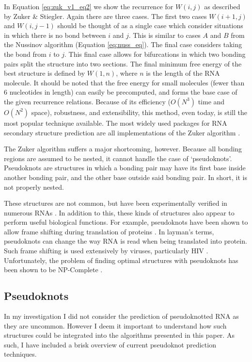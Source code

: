 \documentclass{cshonours}
\begin{document}
In Equation \ref{eq:zuk_v1_eq2} we show the recurrence for $W(i, j)$ as described by Zuker \& Stiegler.
Again there are three cases. The first two cases $W (i + 1, j)$ and $W(i, j − 1)$
should be thought of as a single case which consider situations in which there
is no bond between $i$ and $j$. This is similar to cases $A$ and $B$ from the Nussinov algorithm (Equation \ref{eq:nuss_eq}). The final case considers taking the bond from
$i$ to $j$. This final case allows for bifurcations in which two bonding pairs split
the structure into two sections. The final minimum free energy of the best structure is defined by $W(1, n)$, where $n$ is the length of the RNA molecule. It should
be noted that the free energy for small molecules (fewer than 6 nucleotides in length) can easily be
precomputed, and forms the base case of the given recurrence relations. Because of
its efficiency ($O(N^3)$ time and $O(N^2)$ space), robustness, and extensibility, this method,
even today, is still the most popular technique available. The most widely used packages for RNA secondary structure prediction are all implementations of the Zuker algorithm \cite{reuter2010rnastructure, lorenz2011viennarna}.


The Zuker algorithm suffers a major shortcoming, however. Because all bonding regions are assumed to be nested, it
cannot handle the case of `pseudoknots'. Pseudoknots are structures in which a bonding pair may have its first
base inside another bonding pair, and the other base outside said bonding pair.
In short, it is not properly nested. 

These structures are not common,
but have been experimentally verified in numerous RNAs \cite{taufer2009pseudobase}. In addition to this,
these kinds of structures also appear to perform useful biological functions. For
example, pseudoknots have been shown to allow frame shifting during translation
of proteins \cite{namy2006mechanical}. In layman’s terms, pseudoknots can change the way RNA is read
when being translated into protein. Such frame shifting is used extensively by
viruses, particularly HIV \cite{namy2006mechanical}. Unfortunately, the problem of finding optimal
structures with pseudoknots has been shown to be NP-Complete \cite{lyngso2000rna}.



\subsection{Pseudoknots}
In my investigation I did not consider the prediction of pseudoknotted RNA as they are uncommon. However I deem it important to understand how such structures could be integrated into the algorithms presented in this paper. As such, I have included a brisk overview of current pseudoknot prediction techniques.
\end{document}
